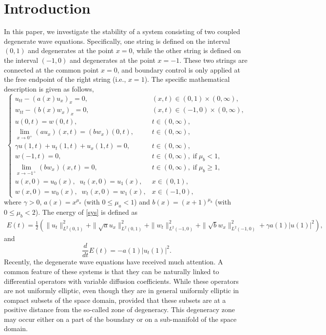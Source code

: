 \documentclass[twoside]{article}
\theoremstyle{noparens}
\theoremstyle{definition}
\numberwithin{equation}{section}
\numberwithin{figure}{section}
\begin{document}
\section{Introduction}
In this paper, we investigate the stability of a system consisting of two coupled degenerate wave equations. Specifically, one string is defined on the interval $(0,1)$ and degenerates at the point $x = 0$, while the other string is defined on the interval $(-1, 0)$ and degenerates at the point $x=-1$. These two strings are connected at the common point $x = 0$, and boundary control is only applied at the free endpoint of the right string (i.e., $x=1$). The specific mathematical description is given as follows,
\begin{equation}\label{sys}
	\begin{cases}
		u_{tt} - (a(x)u_x)_x = 0,&(x,t)\in(0,1)\times(0,\infty),\\
		w_{tt} - (b(x)w_x)_x = 0, &(x,t)\in(-1,0)\times(0,\infty),\\
		u(0,t) = w(0,t),&t\in(0,\infty),\\
		\lim_{x\to 0^+}(au_x)(x,t) = (bw_x)(0,t),&t\in(0,\infty),\\
		\gamma u(1,t) + u_t(1,t) + u_x(1,t) = 0,& t\in(0,\infty),\\
		w(-1,t) = 0,&t\in(0,\infty), \; \mbox{if}\; \mu_b<1,\\
		\lim_{x\rightarrow -1^+} (bw_x)(x,t) = 0,&t\in(0,\infty),\; \mbox{if}\; \mu_b\geq 1,\\
		u(x,0) = u_0(x),\;\;u_t(x,0) = u_1(x),&x\in(0,1),\\
		w(x,0) = w_0(x),\;\; w_t(x,0) = w_1(x),&x\in(-1,0),
	\end{cases}
\end{equation}
where $\gamma>0$, $a(x) = x^{\mu_a}$ (with $0\leq\mu_a<1$) and $b(x)=(x+1)^{\mu_b}$ (with $0\leq\mu_b<2$). The energy of \eqref{sys} is defined as
\begin{equation*}
	\begin{split}
		E(t) = \frac{1}{2}
		\left(\|u_t\|_{L^2(0,1)}^2
		+ \|\sqrt{a}u_x\|_{L^2(0,1)}^2+ \|w_t\|_{L^2(-1,0)}^2  + \|\sqrt{b}w_x\|_{L^2(-1,0)}^2 +\gamma a(1)|u(1)|^2\right),
	\end{split}
\end{equation*}
and
$$\frac{d}{dt}E(t) = - a(1)|u_t(1)|^2.$$
Recently, the degenerate wave equations have received much attention.  A common feature of these systems is that they can be naturally linked to differential operators with variable diffusion coefficients. While these operators are not uniformly elliptic, even though they are in general uniformly elliptic in compact subsets of the space domain, provided that these subsets are at a positive distance from the so-called zone of degeneracy. This degeneracy zone may occur either on a part of the boundary or on a sub-manifold of the space domain.
\end{document}
